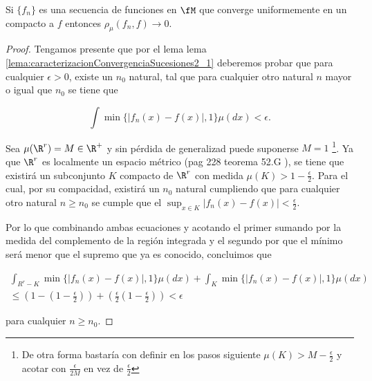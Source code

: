 \begin{lema}  
    Si $\{f_n\}$ es una secuencia de funciones en $\fM$ que converge
    uniformemente en un compacto a $f$ entonces $\rho_{\mu}(f_n, f) \longrightarrow 0$. 
\end{lema}  
\begin{proof}
    Tengamos presente que por el lema  lema \ref{lema:caracterizacionConvergenciaSucesiones2_1} 
    deberemos probar que para cualquier $\epsilon > 0$, 
    existe un $n_0$ natural, tal que para cualquier otro natural $n$ mayor o igual que $n_0$ se tiene que 

    \begin{equation}
        \int \min \{ |f_n(x) - f(x)|, 1\} \mu(dx) < \epsilon.
    \end{equation}  

    Sea $\mu(\R^r) = M \in \R^+$  y 
    sin pérdida de generalizad puede suponerse $M = 1$
     \footnote{De otra forma bastaría con definir 
    en los pasos siguiente $\mu(K) > M - \frac{\epsilon}{2}$ y acotar con $\frac{\epsilon}{2M}$ 
    en vez de $\frac{\epsilon}{2}$}. 
    Ya que $\R^r$ es localmente un espacio métrico 
    (pag 228 teorema 52.G \cite{nla.cat-vn1819421}),
    se tiene que existirá un subconjunto $K$ compacto de $\R^r$ con medida $\mu(K) > 1 - \frac{\epsilon}{2}.$
    Para el cual, por su compacidad, existirá un  $n_0$ natural cumpliendo que para cualquier otro 
    natural $n \geq n_0$ se cumple que el $\sup_{x \in K} |f_n(x) - f(x)| < \frac{\epsilon}{2}.$  

    Por lo que combinando ambas ecuaciones y acotando el primer sumando por la medida 
    del complemento de la región integrada y el segundo por que el mínimo será menor que el 
    supremo que ya es conocido, concluimos que 

    \begin{equation}
        \begin{split}
            \int_{R^r - K} \min \{ |f_n(x) - f(x)|, 1\} \mu(dx) +
            \int_{K} \min \{ |f_n(x) - f(x)|, 1\} \mu(dx)  \\ \leq
            \left( 1 - \left(1 -\frac{\epsilon}{2}\right)\right) + 
            \left(\frac{\epsilon}{2} \left( 1 -\frac{\epsilon}{2} \right)\right) < \epsilon
        \end{split}
    \end{equation}

    para cualquier $n \geq n_0$. 
\end{proof}

